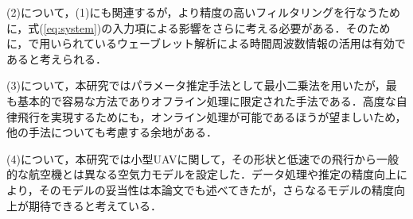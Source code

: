 (2)について，(1)にも関連するが，より精度の高いフィルタリングを行なうために，式(\ref{eq:system})の入力項による影響をさらに考える必要がある．そのために，\cite{narioka}で用いられているウェーブレット解析による時間周波数情報の活用は有効であると考えられる．

(3)について，本研究ではパラメータ推定手法として最小二乗法を用いたが，最も基本的で容易な方法でありオフライン処理に限定された手法である．高度な自律飛行を実現するためにも，オンライン処理が可能であるほうが望ましいため，他の手法についても考慮する余地がある．

(4)について，本研究では小型UAVに関して，その形状と低速での飛行から一般的な航空機とは異なる空気力モデルを設定した．データ処理や推定の精度向上により，そのモデルの妥当性は本論文でも述べてきたが，さらなるモデルの精度向上が期待できると考えている．
